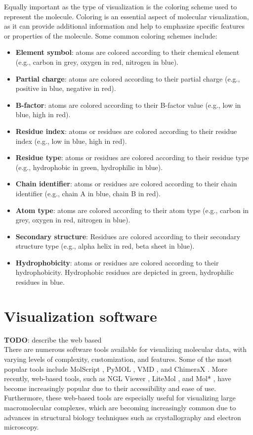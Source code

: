 \documentclass[
  digital,     %
  oneside,     %
  nosansbold,  %
  nocolorbold, %
  lof,         %
  lot,         %
]{fithesis4}
\begin{document}
Equally important as the type of visualization is the coloring scheme used to represent the molecule. Coloring is an essential aspect of molecular visualization, as it can provide additional information and help to emphasize specific features or properties of the molecule. Some common coloring schemes include:

\begin{itemize}
  \item \textbf{Element symbol}: atoms are colored according to their chemical element (e.g., carbon in grey, oxygen in red, nitrogen in blue).
  \item \textbf{Partial charge}: atoms are colored according to their partial charge (e.g., positive in blue, negative in red).
  \item \textbf{B-factor}: atoms are colored according to their B-factor value (e.g., low in blue, high in red).
  \item \textbf{Residue index}: atoms or residues are colored according to their residue index (e.g., low in blue, high in red).
  \item \textbf{Residue type}: atoms or residues are colored according to their residue type (e.g., hydrophobic in green, hydrophilic in blue).
  \item \textbf{Chain identifier}: atoms or residues are colored according to their chain identifier (e.g., chain A in blue, chain B in red).
  \item \textbf{Atom type}: atoms are colored according to their atom type (e.g., carbon in grey, oxygen in red, nitrogen in blue).
  \item \textbf{Secondary structure}: Residues are colored according to their secondary structure type (e.g., alpha helix in red, beta sheet in blue).
  \item \textbf{Hydrophobicity}: atoms or residues are colored according to their hydrophobicity. Hydrophobic residues are depicted in green, hydrophilic residues in blue.
\end{itemize}


\section{Visualization software}
\label{section:visualization_software}

\textbf{TODO}: describe the web based \\

There are numerous software tools available for visualizing molecular data, with varying levels of complexity, customization, and features. Some of the most popular tools include MolScript \cite{kraulis1991molscript}, PyMOL \cite{delano2002pymol}, VMD \cite{humphrey1996vmd}, and ChimeraX \cite{goddard2018ucsf}. More recently, web-based tools, such as NGL Viewer \cite{rose2015ngl}, LiteMol \cite{sehnal2017litemol}, and Mol* \cite{sehnal2021molstar}, have become increasingly popular due to their accessibility and ease of use. Furthermore, these web-based tools are especially useful for visualizing large macromolecular complexes, which are becoming increasingly common due to advances in structural biology techniques such as crystallography and electron microscopy. \cite{sehnal2021molstar}
\end{document}
